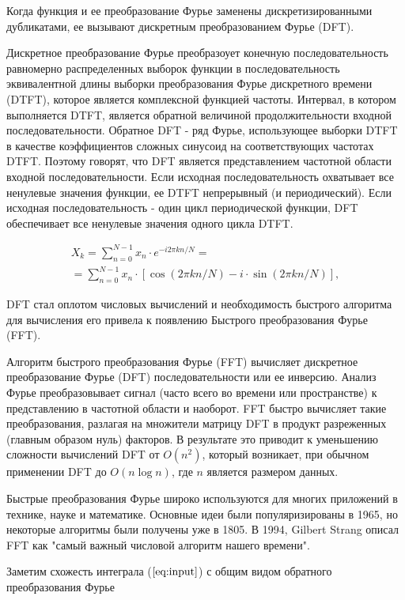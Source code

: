 \documentclass[%
bachelor,    %
natbib,      %
subf,        %
href,        %
colorlinks,  %
]{disser}
\begin{document}
Когда функция и ее преобразование Фурье заменены дискретизированными дубликатами, ее вызывают дискретным преобразованием Фурье (DFT). 

Дискретное преобразование Фурье преобразоует конечную последовательность равномерно распределенных выборок функции в последовательность эквивалентной длины выборки преобразования Фурье дискретного времени (DTFT), которое является комплексной функцией частоты. Интервал, в котором выполняется DTFT, является обратной величиной продолжительности входной последовательности. Обратное DFT - ряд Фурье, использующее выборки DTFT в качестве коэффициентов сложных синусоид на соответствующих частотах DTFT. Поэтому говорят, что DFT является представлением частотной области входной последовательности. Если исходная последовательность охватывает все ненулевые значения функции, ее DTFT непрерывный (и периодический). Если исходная последовательность - один цикл периодической функции, DFT обеспечивает все ненулевые значения одного цикла DTFT.

\begin{eqnarray}
X_{k}=\sum _{n=0}^{N-1}x_{n}\cdot e^{-i2\pi kn/N}= \nonumber \\
=\sum _{n=0}^{N-1}x_{n}\cdot [\cos(2\pi kn/N)-i\cdot \sin(2\pi kn/N)]\nonumber,
\end{eqnarray}


DFT стал оплотом числовых вычислений и необходимость быстрого алгоритма для вычисления его привела к появлению Быстрого преобразования Фурье (FFT).

Алгоритм быстрого преобразования Фурье (FFT) вычисляет дискретное преобразование Фурье (DFT) последовательности или ее инверсию. Анализ Фурье преобразовывает сигнал (часто всего во времени или пространстве) к представлению в частотной области и наоборот. FFT быстро вычисляет такие преобразования, разлагая на множители матрицу DFT в продукт разреженных (главным образом нуль) факторов. В результате это приводит к уменьшению сложности вычислений DFT от $ O (n^ {2})$, который возникает, при обычном применении DFT до $O (n\log n)$, где $ n $  является размером данных.

Быстрые преобразования Фурье широко используются для многих приложений в технике, науке и математике. Основные идеи были популяризированы в 1965, но некоторые алгоритмы были получены уже в 1805. В 1994, Gilbert Strang описал FFT как "самый важный числовой алгоритм нашего времени".

Заметим схожесть интеграла ($\ref{eq:input}$) с общим видом обратного преобразования Фурье
\end{document}
